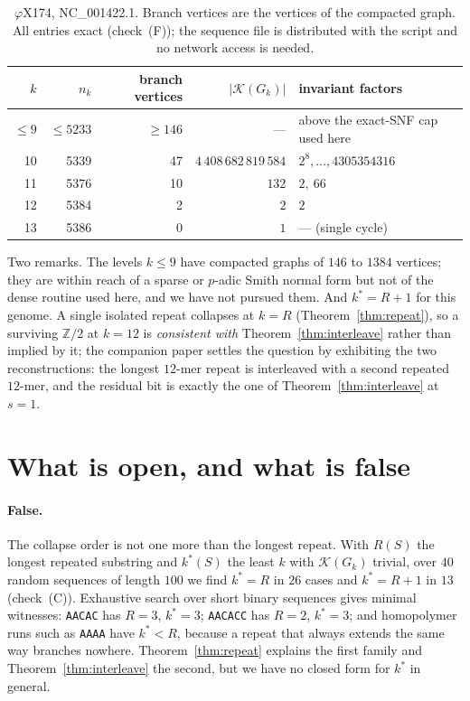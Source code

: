 \documentclass[11pt]{article}
\theoremstyle{plain}
\theoremstyle{definition}
\theoremstyle{remark}
\newcommand{\Z}{\mathbb{Z}}
\newcommand{\K}{\mathcal{K}}
\begin{document}
\begin{table}[ht]
\centering\small
\begin{tabular}{rrrrl}
\toprule
$k$ & $n_k$ & branch vertices & $|\K(G_k)|$ & invariant factors\\
\midrule
$\le9$ & $\le5233$ & $\ge146$ & --- & above the exact-SNF cap used here\\
10 & 5339 & 47 & $4\,408\,682\,819\,584$ & $2^{8},\dots,4305354316$\\
11 & 5376 & 10 & $132$ & $2,\ 66$\\
12 & 5384 &  2 & $2$   & $2$\\
13 & 5386 &  0 & $1$   & --- (single cycle)\\
\bottomrule
\end{tabular}
\caption{$\varphi$X174, NC\_001422.1. Branch vertices are the vertices of the compacted
graph. All entries exact (check~(F)); the sequence file is distributed with the script and
no network access is needed.}
\label{tab:phix}
\end{table}

Two remarks. The levels $k\le9$ have compacted graphs of $146$ to $1384$ vertices; they are
within reach of a sparse or $p$-adic Smith normal form but not of the dense routine used
here, and we have not pursued them. And $k^{*}=R+1$ for this genome. A single isolated repeat collapses at $k=R$
(Theorem~\ref{thm:repeat}), so a surviving $\Z/2$ at $k=12$ is \emph{consistent with}
Theorem~\ref{thm:interleave} rather than implied by it; the companion paper \cite{Bio2}
settles the question by exhibiting the two reconstructions: the longest $12$-mer repeat is
interleaved with a second repeated $12$-mer, and the residual bit is exactly the one of
Theorem~\ref{thm:interleave} at $s=1$.

\section{What is open, and what is false}\label{sec:open}

\paragraph{False.} The collapse order is not one more than the longest repeat. With $R(S)$
the longest repeated substring and $k^{*}(S)$ the least $k$ with $\K(G_k)$ trivial, over
$40$ random sequences of length $100$ we find $k^{*}=R$ in $26$ cases and $k^{*}=R+1$ in
$13$ (check~(C)). Exhaustive search over short binary sequences gives minimal witnesses:
\texttt{AACAC} has $R=3$, $k^{*}=3$; \texttt{AACACC} has $R=2$, $k^{*}=3$; and homopolymer
runs such as \texttt{AAAA} have $k^{*}<R$, because a repeat that always extends the same
way branches nowhere. Theorem~\ref{thm:repeat} explains the first family and
Theorem~\ref{thm:interleave} the second, but we have no closed form for $k^{*}$ in general.
\end{document}
